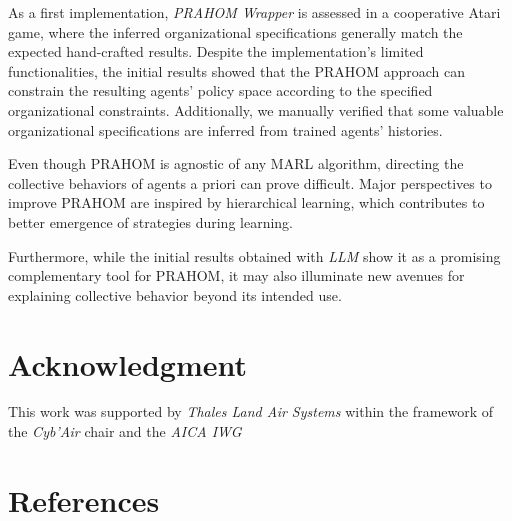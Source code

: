 \documentclass[conference]{IEEEtran}
\begin{document}
As a first implementation, \emph{PRAHOM Wrapper} is assessed in a cooperative Atari game, where the inferred organizational specifications generally match the expected hand-crafted results. Despite the implementation's limited functionalities, the initial results showed that the PRAHOM approach can constrain the resulting agents' policy space according to the specified organizational constraints. Additionally, we manually verified that some valuable organizational specifications are inferred from trained agents' histories.

Even though PRAHOM is agnostic of any MARL algorithm, directing the collective behaviors of agents a priori can prove difficult. Major perspectives to improve PRAHOM are inspired by hierarchical learning, which contributes to better emergence of strategies during learning.

Furthermore, while the initial results obtained with \emph{LLM} show it as a promising complementary tool for PRAHOM, it may also illuminate new avenues for explaining collective behavior beyond its intended use.




\section*{Acknowledgment}

This work was supported by \emph{Thales Land Air Systems} within the framework of the \emph{Cyb'Air} chair and the \emph{AICA IWG}

\section*{References}

% 



\end{document}
